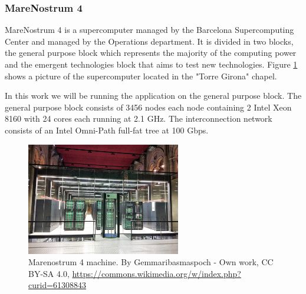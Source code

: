 %
%
%
\subsubsection{MareNostrum 4}

\justify
MareNostrum 4\cite{mn4} is a supercomputer managed by the Barcelona Supercomputing Center and managed by the Operations department. It is divided in two blocks, the general purpose block which represents the majority of the computing power and the emergent technologies block that aims to test new technologies. Figure \ref{fig:mn4} shows a picture of the supercomputer located in the "Torre Girona" chapel.

\justify
In this work we will be running the application on the general purpose block.
The general purpose block consists of 3456 nodes each node containing 2 Intel Xeon 8160 with 24 cores each running at 2.1 GHz. The interconnection network consists of an Intel Omni-Path full-fat tree at 100 Gbps.

\begin{figure}[htbp]
  \centering
  \includegraphics[width=0.6\textwidth]{mn4}
  \caption{Marenostrum 4 machine. {By Gemmaribasmaspoch - Own work, CC BY-SA 4.0, \url{https://commons.wikimedia.org/w/index.php?curid=61308843}}}
  \label{fig:mn4}
\end{figure}

